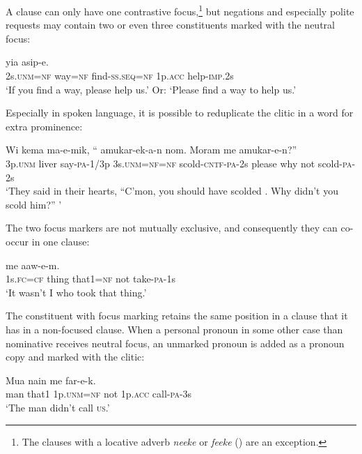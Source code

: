 A clause can only have one contrastive focus,\footnote{The clauses with a locative adverb \textit{neeke} or \textit{feeke} () are an exception.}  but negations and especially polite requests may contain two or even three constituents marked with the neutral focus:

\ea%
\label{ex:x1729}
\gll {}    yia  asip-e.\\
2s.\textsc{unm}=\textsc{nf}  way=\textsc{nf}  find-\textsc{ss}.\textsc{seq}=\textsc{nf}  1p.\textsc{acc}  help-\textsc{imp}.2s\\
\glt`If you find a way, please help us.' Or: `Please find a way to help us.'
\z


Especially in spoken language, it is possible to reduplicate the  clitic in a word for extra prominence:

\ea%
\label{ex:x1731}
\gll Wi  kema  ma-e-mik,  ``  amukar-ek-a-n nom.  Moram  me  amukar-e-n?''  \\
3p.\textsc{unm}  liver  say-\textsc{pa}-1/3p  3s.\textsc{unm}=\textsc{nf}=\textsc{nf}  scold-\textsc{cntf}-\textsc{pa}-2s please  why  not  scold-\textsc{pa}-2s\\
\glt`They said in their hearts, ``C'mon, you should have scolded . Why didn't you scold him?'' '
\z


The two focus markers are not mutually exclusive, and consequently they can co-occur in one clause:

\ea%
\label{ex:x1737}
\gll {}    me  aaw-e-m.\\
1s.\textsc{fc}=\textsc{cf}  thing  that1=\textsc{nf}  not  take-\textsc{pa}-1s\\
\glt`It wasn't I who took that thing.'
\z


The constituent with focus marking retains the same position in a clause that it has in a non-focused clause. When a personal pronoun in some other case than nominative receives neutral focus, an unmarked pronoun is added as a pronoun copy and marked with the  clitic:

\ea%
\label{ex:x1743}
\gll Mua  nain    me    far-e-k. \\
man  that1  1p.\textsc{unm}=\textsc{nf}  not  1p.\textsc{acc}  call-\textsc{pa}-3s      \\
\glt`The man didn't call \textsc{us}.'
\z


